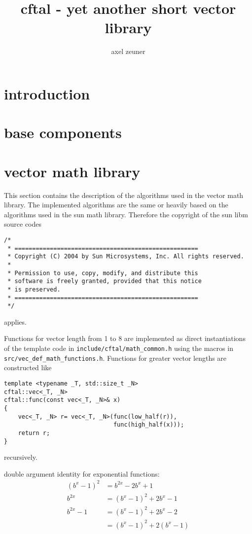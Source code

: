 \documentclass[10pt,a4paper]{article}
\numberwithin{equation}{subsection}
\begin{document}
\title{cftal - yet another short vector library}
\author{axel zeuner}
\maketitle

\tableofcontents

\section{introduction}
\label{sec:introduction}

\section{base components}
\label{sec:base}

\section{vector math library}
\label{sec:vec_math_lib}

This section contains the description of the algorithms used in the
vector math library. The implemented algorithms are the same or heavily
based on the algorithms used in the sun math library. Therefore the
copyright of the sun libm source codes
\begin{verbatim}
/*
 * ====================================================
 * Copyright (C) 2004 by Sun Microsystems, Inc. All rights reserved.
 *
 * Permission to use, copy, modify, and distribute this
 * software is freely granted, provided that this notice
 * is preserved.
 * ====================================================
 */
\end{verbatim}
applies.

Functions for vector length from 1 to 8 are implemented as direct
instantiations of the template code in \texttt{include/cftal/math\_common.h}
using the macros in \texttt{src/vec\_def\_math\_functions.h}.
Functions for greater vector lengths are constructed like
\begin{lstlisting}
template <typename _T, std::size_t _N>
cftal::vec<_T, _N>
cftal::func(const vec<_T, _N>& x)
{
    vec<_T, _N> r= vec<_T, _N>(func(low_half(r)),
                               func(high_half(x)));
    return r;
}
\end{lstlisting}
recursively.

double argument identity for exponential functions:
\[
    \begin{aligned}
        (b^x-1)^2 &= b^{2x} - 2b^x + 1 \\
        b^{2x}    &= (b^x-1)^2 + 2b^x - 1 \\
        b^{2x} -1 &= (b^x-1)^2 + 2b^x -2 \\
                  &= (b^x-1)^2 + 2(b^x-1)
    \end{aligned}
\]
\end{document}
